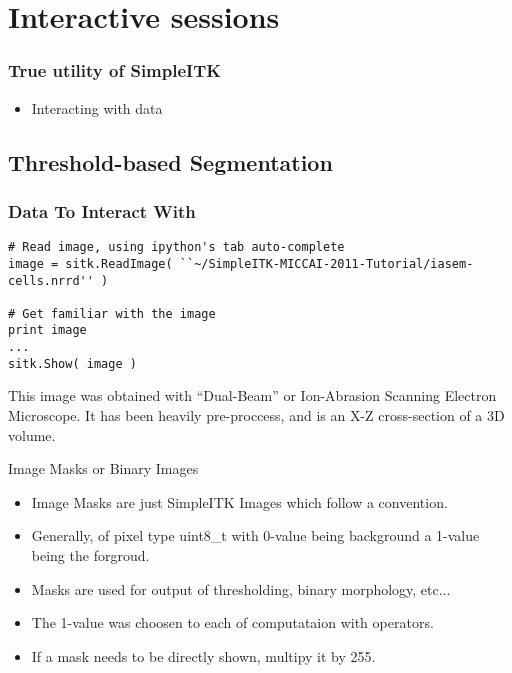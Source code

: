 \section{Interactive sessions}

%
%

\begin{frame}
\frametitle{True utility of SimpleITK}
\begin{itemize}
\item Interacting with data
\end{itemize}
\end{frame}

\subsection{Threshold-based Segmentation}

\begin{frame}[fragile]
\frametitle{Data To Interact With}
\lstpython
\begin{lstlisting}
# Read image, using ipython's tab auto-complete
image = sitk.ReadImage( ``~/SimpleITK-MICCAI-2011-Tutorial/iasem-cells.nrrd'' )

# Get familiar with the image
print image
...
sitk.Show( image )
\end{lstlisting}

This image was obtained with ``Dual-Beam'' or Ion-Abrasion Scanning
Electron Microscope. It has been heavily pre-proccess, and is an X-Z
cross-section of a 3D volume.

\end{frame}

\begin{frame}{Image Masks or Binary Images}

\begin{itemize}
  \item Image Masks are just SimpleITK Images which follow a convention.
  \item Generally, of pixel type uint8\_t with 0-value being background a 1-value being the forgroud.
  \item Masks are used for output of thresholding, binary morphology, etc...
  \item The 1-value was choosen to each of computataion with operators.
  \item If a mask needs to be directly shown, multipy it by 255.
\end{itemize}

\end{frame}



